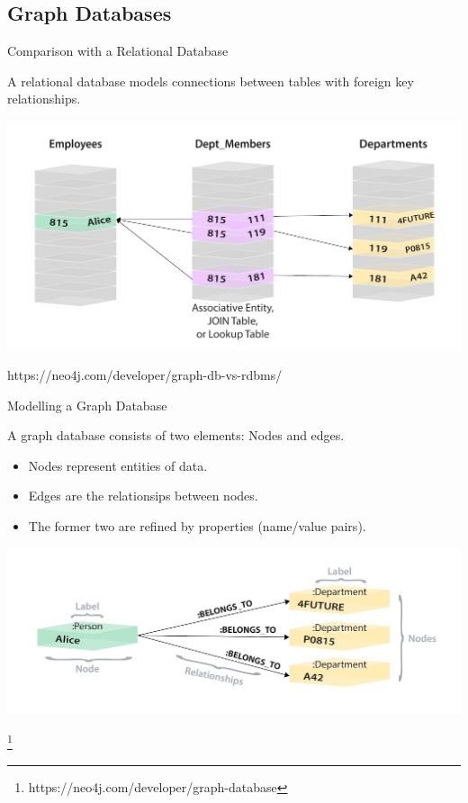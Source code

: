 \documentclass{beamer}
\begin{document}
  \subsection{Graph Databases}

    \begin{frame}{Comparison with a Relational Database}
    
      A relational database models connections between tables with foreign key relationships.
      
      \begin{center}
        \includegraphics[scale=.6]{relational_as_graph}
      \end{center}
      
      https://neo4j.com/developer/graph-db-vs-rdbms/
      
    \end{frame}
    
    \begin{frame}{Modelling a Graph Database}

      A graph database consists of two elements: Nodes and edges.

      \begin{itemize}

        \item<1-> Nodes represent entities of data.
        \item<1-> Edges are the relationsips between nodes.
        \item<2-> The former two are refined by properties (name/value pairs).        
      \end{itemize}
      
      \begin{center}
        \includegraphics[scale=.6]{relational_graph_model}
      \end{center}
      
      \footnote{https://neo4j.com/developer/graph-database}
      
    \end{frame}
    
\end{document}
